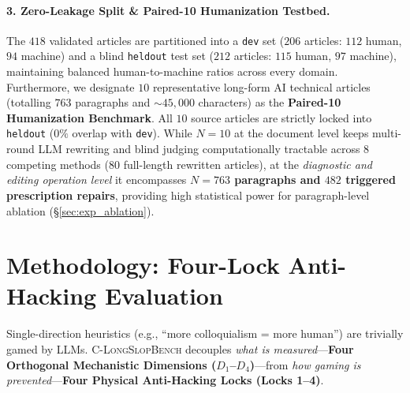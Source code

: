 \documentclass[11pt]{article}
\newcommand{\bench}{\textsc{C-LongSlopBench}}
\begin{document}
\paragraph{3. Zero-Leakage Split \& Paired-10 Humanization Testbed.}
The $418$ validated articles are partitioned into a \texttt{dev} set ($206$ articles: $112$ human, $94$ machine) and a blind \texttt{heldout} test set ($212$ articles: $115$ human, $97$ machine), maintaining balanced human-to-machine ratios across every domain. Furthermore, we designate $10$ representative long-form AI technical articles (totalling $763$ paragraphs and $\sim 45,000$ characters) as the \textbf{Paired-10 Humanization Benchmark}. All $10$ source articles are strictly locked into \texttt{heldout} ($0\%$ overlap with \texttt{dev}). While $N=10$ at the document level keeps multi-round LLM rewriting and blind judging computationally tractable across $8$ competing methods ($80$ full-length rewritten articles), at the \textit{diagnostic and editing operation level} it encompasses \textbf{$N=763$ paragraphs and $482$ triggered prescription repairs}, providing high statistical power for paragraph-level ablation (\S\ref{sec:exp_ablation}).

\section{Methodology: Four-Lock Anti-Hacking Evaluation}
\label{sec:methodology}

Single-direction heuristics (e.g., ``more colloquialism = more human'') are trivially gamed by LLMs. \bench{} decouples \textit{what is measured}---\textbf{Four Orthogonal Mechanistic Dimensions ($D_1$--$D_4$)}---from \textit{how gaming is prevented}---\textbf{Four Physical Anti-Hacking Locks (Locks 1--4)}.
\end{document}
